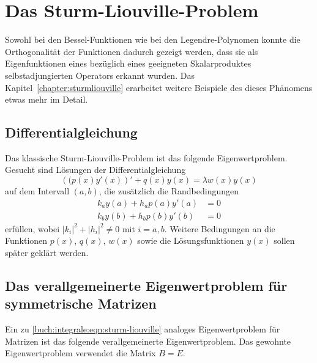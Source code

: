 %
%
%
\section{Das Sturm-Liouville-Problem
\label{buch:integrale:subsection:sturm-liouville-problem}}
Sowohl bei den Bessel-Funktionen wie bei den Legendre-Polynomen
%
%
konnte die Orthogonalität der Funktionen dadurch gezeigt werden,
dass sie als Eigenfunktionen eines bezüglich eines geeigneten
Skalarproduktes selbstadjungierten Operators erkannt wurden.
Das Kapitel~\ref{chapter:sturmliouville} erarbeitet weitere
Beispiele des dieses Phänomens etwas mehr im Detail.

%
%
\subsection{Differentialgleichung \label{sub:differentailgleichung}}
Das klassische Sturm-Liouville-Problem ist das folgende Eigenwertproblem.
Gesucht sind Lösungen der Differentialgleichung
\begin{equation}
\left((p(x)y'(x)\right)' + q(x)y(x) = \lambda w(x) y(x)
\label{buch:integrale:eqn:sturm-liouville}
\end{equation}
auf dem Intervall $(a,b)$, die zusätzlich die Randbedingungen
\begin{equation}
\begin{aligned}
k_a y(a) + h_a p(a) y'(a) &= 0 \\
k_b y(b) + h_b p(b) y'(b) &= 0
\end{aligned}
\label{buch:integrale:sturm:randbedingung}
\end{equation}
erfüllen, wobei $|k_i|^2 + |h_i|^2\ne 0$ mit $i=a,b$.
Weitere Bedingungen an die Funktionen $p(x)$, $q(x)$, $w(x)$  sowie die
Lösungsfunktionen $y(x)$ sollen später geklärt werden.

%
%
\subsection{Das verallgemeinerte Eigenwertproblem für symmetrische Matrizen}
Ein zu \eqref{buch:integrale:eqn:sturm-liouville} analoges Eigenwertproblem
für Matrizen ist das folgende verallgemeinerte Eigenwertproblem.
Das gewohnte Eigenwertproblem verwendet die Matrix $B=E$.

